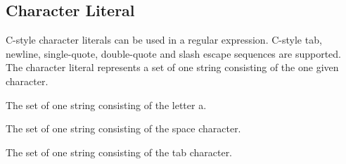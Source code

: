 
\subsection{Character Literal}
{
	C-style character literals can be used in a regular expression.
	C-style tab, newline, single-quote, double-quote and slash escape sequences
	are supported.
	The character literal represents a set of one string consisting of the one
	given character.
	
	\begin{itemize}
	{
		\item[\texttt{`a'}] The set of one string consisting of the letter a.
		
		\item[\texttt{` '}] The set of one string consisting of the space character.
		
		\item[\texttt{`\symbol{92}t'}] The set of one string consisting of the
			tab character.
	}
	\end{itemize}
}
